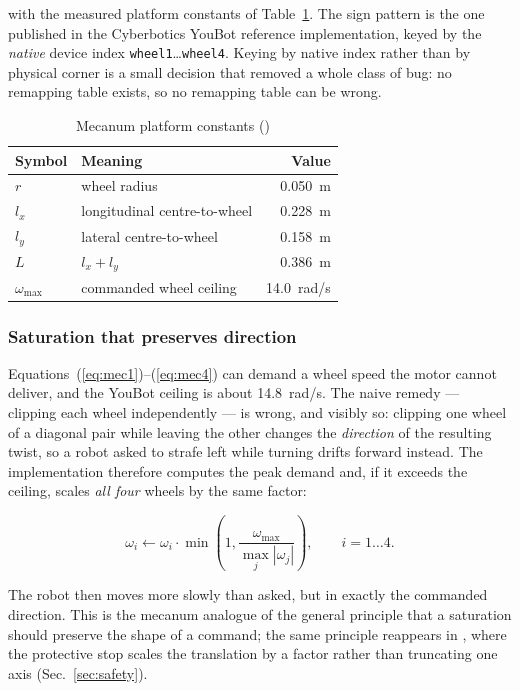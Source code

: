 with the measured platform constants of Table~\ref{tab:mecanum}. The
sign pattern is the one published in the Cyberbotics YouBot reference
implementation, keyed by the \emph{native} device index
\texttt{wheel1}\dots\texttt{wheel4}. Keying by native index rather than
by physical corner is a small decision that removed a whole class of
bug: no remapping table exists, so no remapping table can be wrong.

\begin{table}[!t]
\caption{Mecanum platform constants (\phaseA{})}
\label{tab:mecanum}
\centering\footnotesize
\begin{tabular}{@{}llr@{}}
\toprule
\textbf{Symbol} & \textbf{Meaning} & \textbf{Value}\\
\midrule
$r$   & wheel radius                    & \SI{0.050}{m}\\
$l_x$ & longitudinal centre-to-wheel    & \SI{0.228}{m}\\
$l_y$ & lateral centre-to-wheel         & \SI{0.158}{m}\\
$L$   & $l_x + l_y$                     & \SI{0.386}{m}\\
$\omega_{\max}$ & commanded wheel ceiling & \SI{14.0}{rad/s}\\
\bottomrule
\end{tabular}
\end{table}

\subsubsection{Saturation that preserves direction}

Equations~(\ref{eq:mec1})--(\ref{eq:mec4}) can demand a wheel speed the
motor cannot deliver, and the YouBot ceiling is about
\SI{14.8}{rad/s}. The naive remedy --- clipping each wheel independently
--- is wrong, and visibly so: clipping one wheel of a diagonal pair
while leaving the other changes the \emph{direction} of the resulting
twist, so a robot asked to strafe left while turning drifts forward
instead. The implementation therefore computes the peak demand and, if
it exceeds the ceiling, scales \emph{all four} wheels by the same
factor:

\begin{equation}
\omega_i \leftarrow \omega_i \cdot
  \min\!\left(1, \frac{\omega_{\max}}{\max_j |\omega_j|}\right),
  \qquad i = 1\dots4 .
\label{eq:saturate}
\end{equation}

The robot then moves more slowly than asked, but in exactly the
commanded direction. This is the mecanum analogue of the general
principle that a saturation should preserve the shape of a command; the
same principle reappears in \phaseB{}, where the protective stop scales
the translation by a factor rather than truncating one axis
(Sec.~\ref{sec:safety}).

